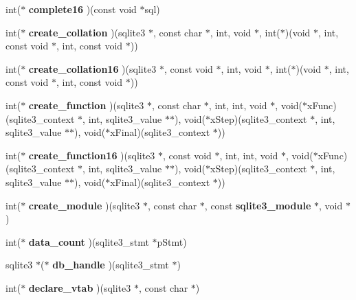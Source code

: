 \begin{CompactItemize}
\item 
int($\ast$ \textbf{complete16} )(const void $\ast$sql)\label{structsqlite3__api__routines_770e7e8496726906c79bcf1058409ae9}

\item 
int($\ast$ \textbf{create\_\-collation} )(sqlite3 $\ast$, const char $\ast$, int, void $\ast$, int($\ast$)(void $\ast$, int, const void $\ast$, int, const void $\ast$))\label{structsqlite3__api__routines_c055315336067426d0297f1765605651}

\item 
int($\ast$ \textbf{create\_\-collation16} )(sqlite3 $\ast$, const void $\ast$, int, void $\ast$, int($\ast$)(void $\ast$, int, const void $\ast$, int, const void $\ast$))\label{structsqlite3__api__routines_7517b31879a871758be900568ea2ccf9}

\item 
int($\ast$ \textbf{create\_\-function} )(sqlite3 $\ast$, const char $\ast$, int, int, void $\ast$, void($\ast$xFunc)(sqlite3\_\-context $\ast$, int, sqlite3\_\-value $\ast$$\ast$), void($\ast$xStep)(sqlite3\_\-context $\ast$, int, sqlite3\_\-value $\ast$$\ast$), void($\ast$xFinal)(sqlite3\_\-context $\ast$))\label{structsqlite3__api__routines_6488d9b672d6b3834b70b4747e8c568a}

\item 
int($\ast$ \textbf{create\_\-function16} )(sqlite3 $\ast$, const void $\ast$, int, int, void $\ast$, void($\ast$xFunc)(sqlite3\_\-context $\ast$, int, sqlite3\_\-value $\ast$$\ast$), void($\ast$xStep)(sqlite3\_\-context $\ast$, int, sqlite3\_\-value $\ast$$\ast$), void($\ast$xFinal)(sqlite3\_\-context $\ast$))\label{structsqlite3__api__routines_7eecbd4fed986bdc02c0ab172dc2cb47}

\item 
int($\ast$ \textbf{create\_\-module} )(sqlite3 $\ast$, const char $\ast$, const {\bf sqlite3\_\-module} $\ast$, void $\ast$)\label{structsqlite3__api__routines_5a1ad5b274ad3c925e1ae8f830a938bc}

\item 
int($\ast$ \textbf{data\_\-count} )(sqlite3\_\-stmt $\ast$pStmt)\label{structsqlite3__api__routines_7e58400e657a621db63af81bc25536ac}

\item 
sqlite3 $\ast$($\ast$ \textbf{db\_\-handle} )(sqlite3\_\-stmt $\ast$)\label{structsqlite3__api__routines_be8f9392ea9325806fa302cd340755ba}

\item 
int($\ast$ \textbf{declare\_\-vtab} )(sqlite3 $\ast$, const char $\ast$)\label{structsqlite3__api__routines_b0a34e0d4a96fd1f902d0f6f06685b47}


\end{CompactItemize}
